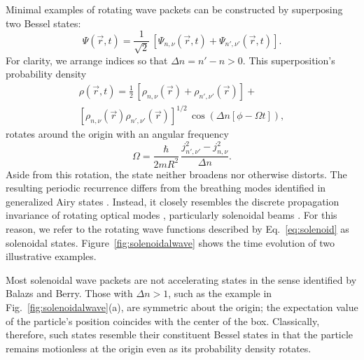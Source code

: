 Minimal examples of rotating wave packets
can be constructed by superposing two Bessel states:
\begin{equation}
  \label{eq:solenoid}
  \Psi(\vec{r}, t)
  =
  \frac{1}{\sqrt{2}} \, \left[
    \Psi_{n,\nu}(\vec{r}, t) +
    \Psi_{n', \nu'}(\vec{r}, t)
  \right].
\end{equation}
For clarity, we arrange indices so that $\Delta n = n' - n > 0$.
This superposition's probability density
\begin{multline}
  \rho(\vec{r}, t)
  =
  \frac{1}{2} \, 
  \left[ \rho_{n,\nu}(\vec{r}) + \rho_{n',\nu'}(\vec{r}) \right] + \\
  \left[ \rho_{n,\nu}(\vec{r}) \rho_{n',\nu'}(\vec{r}) \right]^{1/2} \,
    \cos\left( \Delta n[ \phi - \Omega t] \right),
\end{multline}
rotates around the origin with an angular frequency
\begin{equation}
  \label{eq:frequency}
  \Omega = \frac{\hbar}{2m R^2} \,
  \frac{j_{n',\nu'}^2 - j_{n,\nu}^2}{\Delta n}.
\end{equation}
Aside from this rotation, the state neither broadens nor
otherwise distorts.
The resulting periodic recurrence differs from the
breathing modes identified in generalized Airy states
\cite{kaminer12}.
Instead, it closely resembles the discrete
propagation invariance of rotating optical modes \cite{tervo01},
particularly solenoidal beams \cite{lee10}.
For this reason, we refer to the rotating
wave functions described by Eq.~\eqref{eq:solenoid} as
solenoidal states.
Figure~\ref{fig:solenoidalwave} shows the time evolution of
two illustrative examples.

Most solenoidal wave packets are not accelerating states in the sense
identified by Balazs and Berry.
Those with $\Delta n > 1$, such as the example
in Fig.~\ref{fig:solenoidalwave}(a), are symmetric about the origin;
the expectation value of the particle's position coincides with
the center of the box.
Classically, therefore, such states resemble their constituent Bessel states
in that the particle remains motionless at the origin even as its
probability density rotates.

